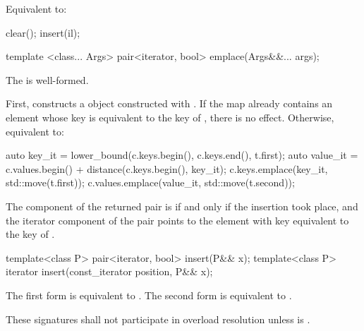 \begin{codeblock}
\begin{codeblock}
\begin{codeblock}
\begin{addedblock}
\begin{itemdescr}
\pnum
\effects Equivalent to:
\begin{codeblock}
clear();
insert(il);
\end{codeblock}
\end{itemdescr}

%
\begin{itemdecl}
template <class... Args> pair<iterator, bool> emplace(Args&&... args);
\end{itemdecl}

\begin{itemdescr}
\pnum
\constraints
The  is
well-formed.

\pnum
\effects
First, constructs a  object 
constructed with .  If the map already
contains an element whose key is equivalent to the key of , there is
no effect.  Otherwise, equivalent to:
\begin{codeblock}
auto key_it = lower_bound(c.keys.begin(), c.keys.end(), t.first);
auto value_it = c.values.begin() + distance(c.keys.begin(), key_it);
c.keys.emplace(key_it, std::move(t.first));
c.values.emplace(value_it, std::move(t.second));
\end{codeblock}

\pnum
\returns
The  component of the returned pair is  if and only if
the insertion took place, and the iterator component of the pair points to the
element with key equivalent to the key of .
\end{itemdescr}

%
\begin{itemdecl}
template<class P> pair<iterator, bool> insert(P&& x);
template<class P> iterator insert(const_iterator position, P&& x);
\end{itemdecl}

\begin{itemdescr}
\pnum
\effects
The first form is equivalent to
. The second form is
equivalent to .

\pnum
\remarks
These signatures shall not participate in overload resolution
unless  is
.
\end{itemdescr}


\end{addedblock}
\end{codeblock}
\end{codeblock}
\end{codeblock}
